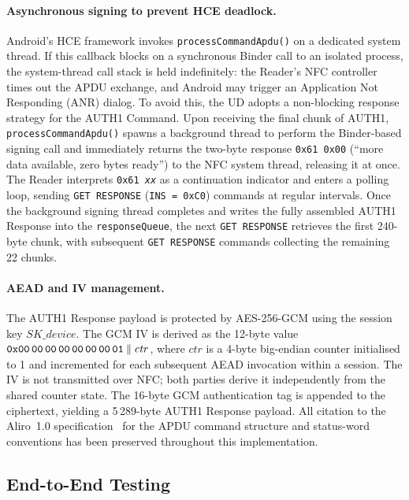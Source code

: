 \paragraph{Asynchronous signing to prevent HCE deadlock.}
Android's HCE framework invokes \texttt{processCommandApdu()} on a dedicated
system thread.
If this callback blocks on a synchronous Binder call to an isolated process,
the system-thread call stack is held indefinitely: the Reader's NFC controller
times out the APDU exchange, and Android may trigger an Application Not
Responding (ANR) dialog.
To avoid this, the UD adopts a non-blocking response strategy for the AUTH1
Command.
Upon receiving the final chunk of AUTH1, \texttt{processCommandApdu()} spawns
a background thread to perform the Binder-based signing call and immediately
returns the two-byte response \texttt{0x61\,0x00} (``more data available, zero
bytes ready'') to the NFC system thread, releasing it at once.
The Reader interprets \texttt{0x61\,\textit{xx}} as a continuation indicator
and enters a polling loop, sending \texttt{GET RESPONSE} (\texttt{INS = 0xC0})
commands at regular intervals.
Once the background signing thread completes and writes the fully assembled
AUTH1 Response into the \texttt{responseQueue}, the next \texttt{GET RESPONSE}
retrieves the first 240-byte chunk, with subsequent \texttt{GET RESPONSE}
commands collecting the remaining 22 chunks.

\paragraph{AEAD and IV management.}
The AUTH1 Response payload is protected by AES-256-GCM using the session key
$\mathit{SK\_device}$.
The GCM IV is derived as the 12-byte value
$\texttt{0x00\,00\,00\,00\,00\,00\,00\,01} \mathbin{\|} \mathit{ctr}$,
where $\mathit{ctr}$ is a 4-byte big-endian counter initialised to 1 and
incremented for each subsequent AEAD invocation within a session.
The IV is not transmitted over NFC; both parties derive it independently from
the shared counter state.
The 16-byte GCM authentication tag is appended to the ciphertext, yielding
a 5\,289-byte AUTH1 Response payload.
All citation to the Aliro~1.0 specification~\cite{CSA:Aliro10} for the
APDU command structure and status-word conventions has been preserved
throughout this implementation.

\subsection{End-to-End Testing}
\label{sec:impl:testing}

